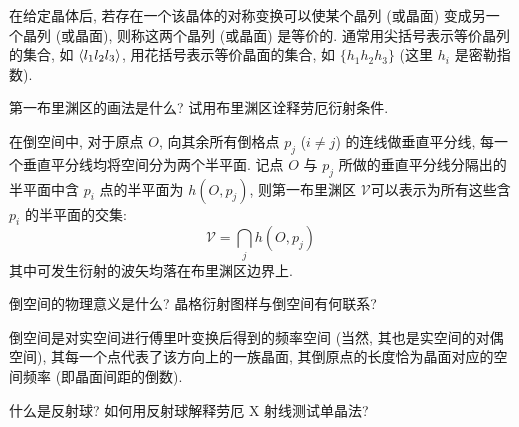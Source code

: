 \documentclass[UTF8]{ctexart}
\newenvironment{Answer}{}{}
\begin{document}
\begin{Question}
\begin{Answer}
\begin{Solve}[Answer:]
        \hspace*{2em}在给定晶体后, 若存在一个该晶体的对称变换可以使某个晶列 (或晶面) 变成另一个晶列 (或晶面), 则称这两个晶列 (或晶面) 是等价的. 通常用尖括号表示等价晶列的集合, 如 $\Braket{l_1 l_2 l_3}$, 用花括号表示等价晶面的集合, 如 $\{h_1 h_2 h_3\}$ (这里 $h_i$ 是密勒指数).
    \end{Solve}
\end{Answer}

            \item 第一布里渊区的画法是什么? 试用布里渊区诠释劳厄衍射条件.

\begin{Answer}
    \begin{Solve}[Answer:]
        \hspace*{2em}在倒空间中, 对于原点 $O$, 向其余所有倒格点 $p_j$ ($i \neq j$) 的连线做垂直平分线, 每一个垂直平分线均将空间分为两个半平面. 记点 $O$ 与 $p_j$ 所做的垂直平分线分隔出的半平面中含 $p_i$ 点的半平面为 $h(O, p_j)$, 则第一布里渊区 $\mathscr{V}$可以表示为所有这些含 $p_i$ 的半平面的交集:
            \begin{equation*}
                \mathscr{V} = \bigcap_{j} h(O, p_j)
            \end{equation*}
        其中可发生衍射的波矢均落在布里渊区边界上.
    \end{Solve}
\end{Answer}

            \item 倒空间的物理意义是什么? 晶格衍射图样与倒空间有何联系?

\begin{Answer}
    \begin{Solve}[Solve:]
        \hspace*{2em}倒空间是对实空间进行傅里叶变换后得到的频率空间 (当然, 其也是实空间的对偶空间), 其每一个点代表了该方向上的一族晶面, 其倒原点的长度恰为晶面对应的空间频率 (即晶面间距的倒数). 
    \end{Solve}
\end{Answer}

            \item 什么是反射球? 如何用反射球解释劳厄 X 射线测试单晶法?
        \end{Question}
\end{document}
